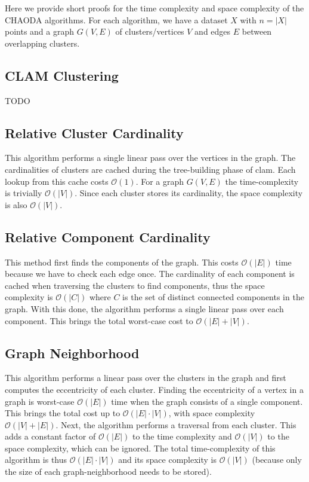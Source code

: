 \documentclass{article}
\begin{document}
Here we provide short proofs for the time complexity and space complexity of the CHAODA algorithms.
For each algorithm, we have
a dataset $X$ with $n = |X|$ points and
a graph $G(V, E)$ of clusters/vertices $V$ and edges $E$ between overlapping clusters.

\subsection{CLAM Clustering}

TODO

\subsection{Relative Cluster Cardinality}

This algorithm performs a single linear pass over the vertices in the graph.
The cardinalities of clusters are cached during the tree-building phase of clam.
Each lookup from this cache costs $\mathcal{O}(1)$.
For a graph $G(V, E)$ the time-complexity is trivially $\mathcal{O}(|V|)$.
Since each cluster stores its cardinality, the space complexity is also $\mathcal{O}(|V|)$.

\subsection{Relative Component Cardinality}

This method first finds the components of the graph.
This costs $\mathcal{O}(|E|)$ time because we have to check each edge once.
The cardinality of each component is cached when traversing the clusters to find components, thus the space complexity is $\mathcal{O}(|C|)$ where $C$ is the set of distinct connected components in the graph.
With this done, the algorithm performs a single linear pass over each component.
This brings the total worst-case cost to $\mathcal{O}(|E| + |V|)$.

\subsection{Graph Neighborhood}

This algorithm performs a linear pass over the clusters in the graph and first computes the eccentricity of each cluster.
Finding the eccentricity of a vertex in a graph is worst-case $\mathcal{O}(|E|)$ time when the graph consists of a single component.
This brings the total cost up to $\mathcal{O}(|E| \cdot |V|)$, with space complexity $\mathcal{O}(|V|+|E|)$.
Next, the algorithm performs a traversal from each cluster.
This adds a constant factor of $\mathcal{O}(|E|)$ to the time complexity and $\mathcal{O}(|V|)$ to the space complexity, which can be ignored.
The total time-complexity of this algorithm is thus $\mathcal{O}(|E| \cdot |V|)$ and its space complexity is $\mathcal{O}(|V|)$ (because only the size of each graph-neighborhood needs to be stored).
\end{document}
